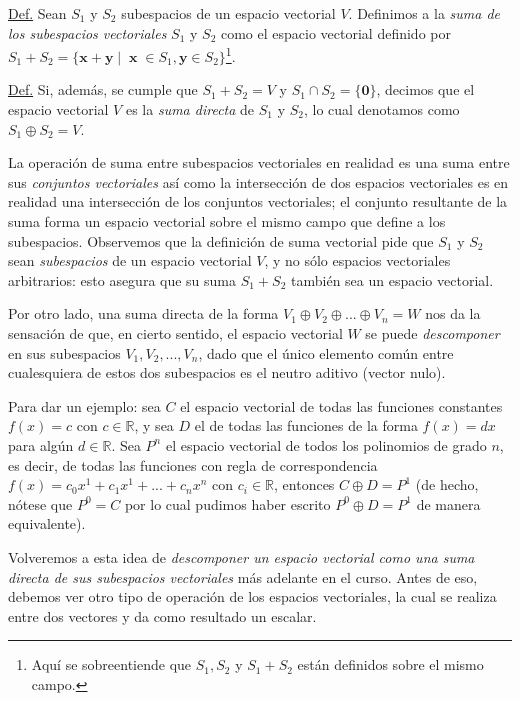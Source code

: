 \documentclass[apuntes]{subfiles}
\begin{document}
\begin{tcolorbox}
\underline{Def.} Sean $S_1$ y $S_2$ subespacios de un espacio vectorial $V$. Definimos a la \emph{suma de los subespacios vectoriales} $S_1$ y $S_2$ como el espacio vectorial definido por $S_1+S_2=\{\mathbf{x}+\mathbf{y}\mathop|\mathop \mathbf{x}\in S_1, \mathbf{y}\in S_2\}$\footnote{Aquí se sobreentiende que $S_1, S_2$ y $S_1+S_2$ están definidos sobre el mismo campo.}.

\vspace{3mm}

\underline{Def.} Si, además, se cumple que $S_1+S_2=V$ y $S_1 \cap S_2 = \{\mathbf{0}\}$, decimos que el espacio vectorial $V$ es la \emph{suma directa} de $S_1$ y $S_2$, lo cual denotamos como $S_1\oplus S_2=V$.
\end{tcolorbox}

La operación de suma entre subespacios vectoriales en realidad es una suma entre sus \emph{conjuntos vectoriales} \textemdash así como la intersección de dos espacios vectoriales es en realidad una intersección de los conjuntos vectoriales\textemdash; el conjunto resultante de la suma forma un espacio vectorial sobre el mismo campo que define a los subespacios. Observemos que la definición de suma vectorial pide que $S_1$ y $S_2$ sean \emph{subespacios} de un espacio vectorial $V$, y no sólo espacios vectoriales arbitrarios: esto asegura que su suma $S_1+S_2$ también sea un espacio vectorial.

Por otro lado, una suma directa de la forma $V_1\oplus V_2\oplus...\oplus V_n=W$ nos da la sensación de que, en cierto sentido, el espacio vectorial $W$ se puede \emph{descomponer} en sus subespacios $V_1, V_2,...,V_n$, dado que el único elemento común entre cualesquiera de estos dos subespacios es el neutro aditivo (vector nulo).

\vspace{3mm}

Para dar un ejemplo: sea $C$ el espacio vectorial de todas las funciones constantes $f(x) = c$ con $c\in\mathbb{R}$, y sea $D$ el de todas las funciones de la forma $f(x) = d x$ para algún $d\in\mathbb{R}$. Sea $P^n$ el espacio vectorial de todos los polinomios de grado $n$, es decir, de todas las funciones con regla de correspondencia $f(x) = c_0 x^1 + c_1 x^1 + ... + c_n x^n$ con $c_i\in\mathbb{R}$, entonces $C\oplus D = P^1$ (de hecho, nótese que $P^0=C$ por lo cual pudimos haber escrito $P^0\oplus D=P^1$ de manera equivalente).

\vspace{3mm}

Volveremos a esta idea de \emph{descomponer un espacio vectorial como una suma directa de sus subespacios vectoriales} más adelante en el curso. Antes de eso, debemos ver otro tipo de operación de los espacios vectoriales, la cual se realiza entre dos vectores y da como resultado un escalar.
\end{document}
